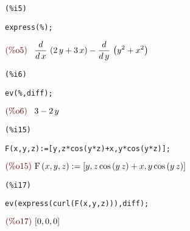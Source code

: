 \documentclass[12pt]{article}
\begin{document}
\noindent
\begin{minipage}[t]{8ex}{\color{red}\bf
\begin{verbatim}
(%i5) 
\end{verbatim}}
\end{minipage}
\begin{minipage}[t]{\textwidth}{\color{blue}
\begin{verbatim}
express(%);
\end{verbatim}}
\end{minipage}
\begin{math}\displaystyle
\parbox{8ex}{\color{labelcolor}(\%o5) }
\frac{d}{d\,x}\,\left( 2\,y+3\,x\right) -\frac{d}{d\,y}\,\left( {y}^{2}+{x}^{2}\right) 
\end{math}


\noindent
\begin{minipage}[t]{8ex}{\color{red}\bf
\begin{verbatim}
(%i6) 
\end{verbatim}}
\end{minipage}
\begin{minipage}[t]{\textwidth}{\color{blue}
\begin{verbatim}
ev(%,diff);
\end{verbatim}}
\end{minipage}
\begin{math}\displaystyle
\parbox{8ex}{\color{labelcolor}(\%o6) }
3-2\,y
\end{math}


\noindent
\begin{minipage}[t]{8ex}{\color{red}\bf
\begin{verbatim}
(%i15) 
\end{verbatim}}
\end{minipage}
\begin{minipage}[t]{\textwidth}{\color{blue}
\begin{verbatim}
F(x,y,z):=[y,z*cos(y*z)+x,y*cos(y*z)];
\end{verbatim}}
\end{minipage}
\begin{math}\displaystyle
\parbox{8ex}{\color{labelcolor}(\%o15) }
\mathrm{F}\left( x,y,z\right) :=[y,z\,\mathrm{cos}\left( y\,z\right) +x,y\,\mathrm{cos}\left( y\,z\right) ]
\end{math}


\noindent
\begin{minipage}[t]{8ex}{\color{red}\bf
\begin{verbatim}
(%i17) 
\end{verbatim}}
\end{minipage}
\begin{minipage}[t]{\textwidth}{\color{blue}
\begin{verbatim}
ev(express(curl(F(x,y,z))),diff);
\end{verbatim}}
\end{minipage}
\begin{math}\displaystyle
\parbox{8ex}{\color{labelcolor}(\%o17) }
[0,0,0]
\end{math}
\end{document}
